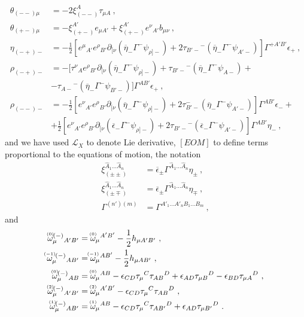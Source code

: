 \documentclass[a4paper,10pt,openany]{article}
\begin{document}
\begin{subequations}
\begin{align}
			\theta_{(--)\mu}&=-2\xi^{A}_{(--)}\tau_{\mu A}\ , \\
			\theta_{(+-)\mu}&=-\xi^{A'}_{(+-)}e_{\mu A'}+\xi^{A'}_{(+-)}e^{\nu}{}_{A'}b_{\mu\nu}\ , \\
			\eta_{(-+)-}&=-\frac{1}{2}[e^{\mu}{}_{A'}e^{\rho}{}_{B'}\partial_{[\nu}(\overline{\eta}_{-}\Gamma^{-}\psi_{\rho]-})+2\tau_{B'-}{}^{-}(\overline{\eta}_{-}\Gamma^{-}\psi_{A'-})]\Gamma^{+A'B'}\epsilon_{+}\ , \\
			\rho_{(-+)-}&=-[\tau^{\nu}{}_{A}e^{\rho}{}_{B'}\partial_{[\nu}(\overline{\eta}_{-}\Gamma^{-}\psi_{\rho]-})+\tau_{B'-}{}^{-}(\overline{\eta}_{-}\Gamma^{-}\psi_{A-})+\nonumber\\
			&-\tau_{A-}{}^{-}(\overline{\eta}_{-}\Gamma^{-}\psi_{B'-})]\Gamma^{AB'}\epsilon_{+}\ , \\
			\rho_{(--)-}&=-\frac{1}{2}[e^{\nu}{}_{A'}e^{\rho}{}_{B'}\partial_{[\nu}(\overline{\eta}_{-}\Gamma^{-}\psi_{\rho]-})+2\tau_{B'-}^{-}(\overline{\eta}_{-}\Gamma^{-}\psi_{A'-})]\Gamma^{AB'}\epsilon_{-}+\nonumber\\
			&+\frac{1}{2}[e^{\nu}{}_{A'}e^{\rho}{}_{B'}\partial_{[\nu}(\overline{\epsilon}_{-}\Gamma^{-}\psi_{\rho]-})+2\tau_{B'-}{}^{-}(\overline{\epsilon}_{-}\Gamma^{-}\psi_{A'-})]\Gamma^{AB'}\eta_{-}\ ,
		\end{align}
	\end{subequations}
	and we have used $\mathcal{L}_{X}$ to denote Lie derivative,  $[EOM]$ to define terms proportional to the equations of motion, the notation
	\begin{align}
		\xi^{\hat{A}_{1}...\hat{A}_{n}}_{(\pm\pm)}&=\overline{\epsilon}_{\pm}\Gamma^{\hat{A}_{1}...\hat{A}_{n}}\eta_{\pm}\ ,\\
		\xi^{\hat{A}_{1}...\hat{A}_{n}}_{(\pm\mp)}&=\overline{\epsilon}_{\pm}\Gamma^{\hat{A}_{1}...\hat{A}_{n}}\eta_{\mp}\ ,\\
		\Gamma^{(n')(m)}&=\Gamma^{A'_{1}...A'_{n}B_{1}...B_{m}}\ ,
	\end{align}
	and
	\begin{subequations}
		\begin{align}
			\accentset{(0)}{\omega}_{\mu}^{(-)}{}_{A'B'}&=\accentset{(0)}{\omega}_{\mu}{}^{A'B'}-\frac{1}{2}h_{\mu A'B'}\ , \\
			\accentset{(-1)}{\omega}_{\mu}^{\ (-)}{}_{AB'}&=\accentset{(-1)}{\omega}_{\mu}{}^{AB'}-\frac{1}{2}h_{\mu AB'}\ , \\
			\accentset{(0)}{\omega}_{\mu}^{(-)}{}_{AB}&=\accentset{(0)}{\omega}_{\mu}{}^{AB}-\epsilon_{CD}\tau_{\mu}{}^{C}\tau_{AB}{}^{D}+\epsilon_{AD}\tau_{\mu B}{}^{D}-\epsilon_{BD}\tau_{\mu A}{}^{D}\ , \\
			\accentset{(2)}{\omega}_{\mu}^{(-)}{}_{A'B'}&=\accentset{(2)}{\omega}_{\mu}{}^{A'B'}-\epsilon_{CD}\tau_{\mu}{}^{C}\tau_{AB}{}^{D}\ , \\
			\accentset{(1)}{\omega}_{\mu}^{(-)}{}_{AB'}&=\accentset{(1)}{\omega}_{\mu}{}^{AB}-\epsilon_{CD}\tau_{\mu}{}^{C}\tau_{AB'}{}^{D}+\epsilon_{AD}\tau_{\mu B'}{}^{D}\ .
		\end{align}
	\end{subequations}
\end{document}
